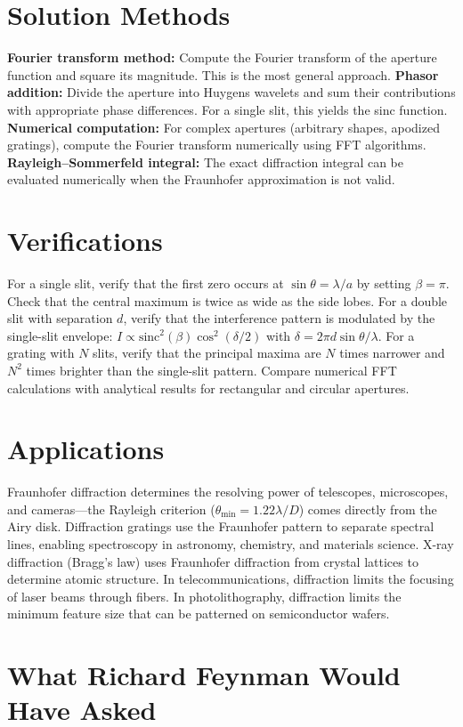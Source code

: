 \documentclass[11pt,openright]{book}
\begin{document}
\section*{Solution Methods}

\textbf{Fourier transform method:} Compute the Fourier transform of the aperture function and square its magnitude. This is the most general approach. \textbf{Phasor addition:} Divide the aperture into Huygens wavelets and sum their contributions with appropriate phase differences. For a single slit, this yields the sinc function. \textbf{Numerical computation:} For complex apertures (arbitrary shapes, apodized gratings), compute the Fourier transform numerically using FFT algorithms. \textbf{Rayleigh--Sommerfeld integral:} The exact diffraction integral can be evaluated numerically when the Fraunhofer approximation is not valid.
\section*{Verifications}

For a single slit, verify that the first zero occurs at $\sin\theta = \lambda/a$ by setting $\beta = \pi$. Check that the central maximum is twice as wide as the side lobes. For a double slit with separation $d$, verify that the interference pattern is modulated by the single-slit envelope: $I \propto \text{sinc}^2(\beta)\cos^2(\delta/2)$ with $\delta = 2\pi d\sin\theta/\lambda$. For a grating with $N$ slits, verify that the principal maxima are $N$ times narrower and $N^2$ times brighter than the single-slit pattern. Compare numerical FFT calculations with analytical results for rectangular and circular apertures.
\section*{Applications}

Fraunhofer diffraction determines the resolving power of telescopes, microscopes, and cameras---the Rayleigh criterion ($\theta_{\min} = 1.22\lambda/D$) comes directly from the Airy disk. Diffraction gratings use the Fraunhofer pattern to separate spectral lines, enabling spectroscopy in astronomy, chemistry, and materials science. X-ray diffraction (Bragg's law) uses Fraunhofer diffraction from crystal lattices to determine atomic structure. In telecommunications, diffraction limits the focusing of laser beams through fibers. In photolithography, diffraction limits the minimum feature size that can be patterned on semiconductor wafers.
\section*{What Richard Feynman Would Have Asked}
\end{document}
